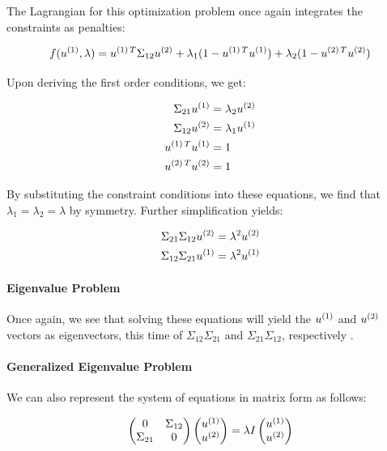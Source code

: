 The Lagrangian for this optimization problem once again integrates the constraints as penalties:

\begin{equation}
    f(u^{(1)}, \lambda) = u^{(1)\,T} \Sigma_{12} u^{(2)} + \lambda_1 (1 - u^{(1)\,T}u^{(1)}) + \lambda_2 (1 - u^{(2)\,T}u^{(2)})
\end{equation}

Upon deriving the first order conditions, we get:

\begin{align}
    \Sigma_{21} u^{(1)} & = \lambda_2 u^{(2)} \\
    \Sigma_{12} u^{(2)} & = \lambda_1 u^{(1)} \\
    u^{(1)\,T}u^{(1)}  & = 1                  \\
    u^{(2)\,T}u^{(2)}  & = 1
\end{align}

By substituting the constraint conditions into these equations, we find that \( \lambda_1 = \lambda_2 = \lambda \) by symmetry. Further simplification yields:

\begin{align}
    \Sigma_{21} \Sigma_{12} u^{(2)} & = \lambda^2 u^{(2)} \\
    \Sigma_{12} \Sigma_{21} u^{(1)} & = \lambda^2 u^{(1)}
\end{align}

\paragraph{Eigenvalue Problem}

Once again, we see that solving these equations will yield the \( u^{(1)} \) and \( u^{(2)} \) vectors as eigenvectors, this time of \( \Sigma_{12} \Sigma_{21} \) and \( \Sigma_{21} \Sigma_{12} \), respectively \citep{hoskuldsson1988pls}.

\paragraph{Generalized Eigenvalue Problem}

We can also represent the system of equations in matrix form as follows:

\begin{align}
    \begin{pmatrix}
        0           & \Sigma_{12} \\
        \Sigma_{21} & 0
    \end{pmatrix}
    \begin{pmatrix}
        u^{(1)} \\
        u^{(2)}
    \end{pmatrix}
    =
    \lambda
    I
    \begin{pmatrix}
        u^{(1)} \\
        u^{(2)}
    \end{pmatrix}
\end{align}

